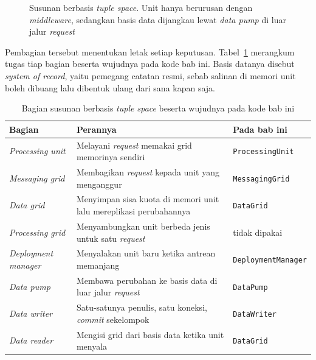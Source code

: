 \begin{figure}[htbp]
{}
  \caption{Susunan berbasis \textit{tuple space}. Unit hanya berurusan dengan
    \textit{middleware}, sedangkan basis data dijangkau lewat \textit{data pump}
    di luar jalur \textit{request}}
  \label{fig:topologi-ruang}
\end{figure}

Pembagian tersebut menentukan letak setiap keputusan.
Tabel~\ref{tab:bagian-ruang} merangkum tugas tiap bagian beserta wujudnya pada
kode bab ini. Basis datanya disebut \textit{system of
record}, yaitu pemegang
catatan resmi, sebab salinan di memori unit boleh dibuang lalu dibentuk ulang
dari sana kapan saja.

\begin{table}[htbp]
  \centering
  \caption{Bagian susunan berbasis \textit{tuple space} beserta wujudnya pada
    kode bab ini}
  \label{tab:bagian-ruang}
  \begin{tabularx}{\textwidth}{|l|X|l|}
    \hline
    \textbf{Bagian} & \textbf{Perannya} & \textbf{Pada bab ini} \\
    \hline
    \textit{Processing unit} & Melayani \textit{request} memakai grid memorinya sendiri & \texttt{ProcessingUnit} \\
    \hline
    \textit{Messaging grid} & Membagikan \textit{request} kepada unit yang menganggur & \texttt{MessagingGrid} \\
    \hline
    \textit{Data grid} & Menyimpan sisa kuota di memori unit lalu mereplikasi perubahannya & \texttt{DataGrid} \\
    \hline
    \textit{Processing grid} & Menyambungkan unit berbeda jenis untuk satu \textit{request} & tidak dipakai \\
    \hline
    \textit{Deployment manager} & Menyalakan unit baru ketika antrean memanjang & \texttt{DeploymentManager} \\
    \hline
    \textit{Data pump} & Membawa perubahan ke basis data di luar jalur \textit{request} & \texttt{DataPump} \\
    \hline
    \textit{Data writer} & Satu-satunya penulis, satu koneksi, \textit{commit} sekelompok & \texttt{DataWriter} \\
    \hline
    \textit{Data reader} & Mengisi grid dari basis data ketika unit menyala & \texttt{DataGrid} \\
    \hline
  \end{tabularx}
\end{table}

